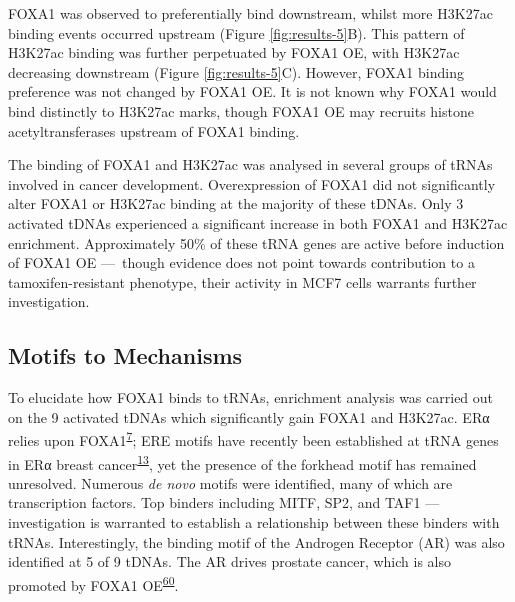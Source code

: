 \documentclass[
  12pt,
]{article}
\begin{document}
FOXA1 was observed to preferentially bind downstream, whilst more H3K27ac binding events occurred upstream (Figure \ref{fig:results-5}B).
This pattern of H3K27ac binding was further perpetuated by FOXA1 OE, with H3K27ac decreasing downstream (Figure \ref{fig:results-5}C).
However, FOXA1 binding preference was not changed by FOXA1 OE. It is not known why FOXA1 would bind distinctly to H3K27ac marks, though FOXA1 OE may recruits histone acetyltransferases upstream of FOXA1 binding.

The binding of FOXA1 and H3K27ac was analysed in several groups of tRNAs involved in cancer development.
Overexpression of FOXA1 did not significantly alter FOXA1 or H3K27ac binding at the majority of these tDNAs.
Only 3 activated tDNAs experienced a significant increase in both FOXA1 and H3K27ac enrichment.
Approximately 50\% of these tRNA genes are active before induction of FOXA1 OE ---~though evidence does not point towards contribution to a tamoxifen-resistant phenotype, their activity in MCF7 cells warrants further investigation.

\hypertarget{motifs-to-mechanisms}{%
\subsection{Motifs to Mechanisms}\label{motifs-to-mechanisms}}

To elucidate how FOXA1 binds to tRNAs, enrichment analysis was carried out on the 9 activated tDNAs which significantly gain FOXA1 and H3K27ac.
ERα relies upon FOXA1\textsuperscript{\protect\hyperlink{ref-carroll2005}{7}}; ERE motifs have recently been established at tRNA genes in ERα breast cancer\textsuperscript{\protect\hyperlink{ref-malcolm2022}{13}}, yet the presence of the forkhead motif has remained unresolved.
Numerous \emph{de novo} motifs were identified, many of which are transcription factors.
Top binders including MITF, SP2, and TAF1 --- investigation is warranted to establish a relationship between these binders with tRNAs.
Interestingly, the binding motif of the Androgen Receptor (AR) was also identified at 5 of 9 tDNAs.
The AR drives prostate cancer, which is also promoted by FOXA1 OE\textsuperscript{\protect\hyperlink{ref-gerhardt2012}{60}}.
\end{document}
